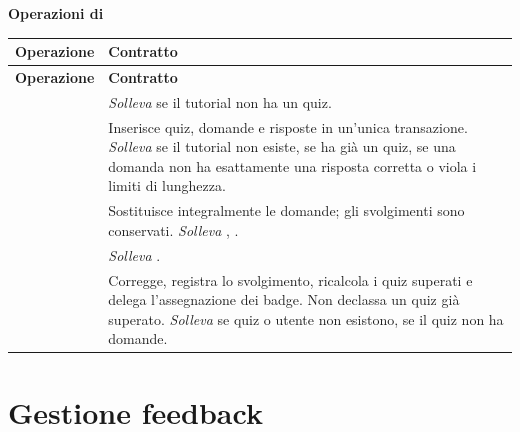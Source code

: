 \textbf{Operazioni di }

\begin{longtable}{@{}L{5.8cm} L{8.6cm}@{}}
\toprule
\textbf{Operazione} & \textbf{Contratto} \\
\midrule
\endfirsthead
\toprule
\textbf{Operazione} & \textbf{Contratto} \\
\midrule
\endhead
\bottomrule
\endlastfoot

 &
\emph{Solleva}  se il tutorial non ha un quiz. \\

 &
Inserisce quiz, domande e risposte in un'unica transazione.
\emph{Solleva}  se il tutorial non esiste,
 se ha già un quiz,  se una domanda non
ha esattamente una risposta corretta o viola i limiti di lunghezza. \\

 &
Sostituisce integralmente le domande; gli svolgimenti sono conservati.
\emph{Solleva} , . \\

 & \emph{Solleva} . \\

 &
Corregge, registra lo svolgimento, ricalcola i quiz superati e delega
l'assegnazione dei badge. Non declassa un quiz già superato.
\emph{Solleva}  se quiz o utente non esistono,
 se il quiz non ha domande. \\

\end{longtable}

\section{Gestione feedback}

